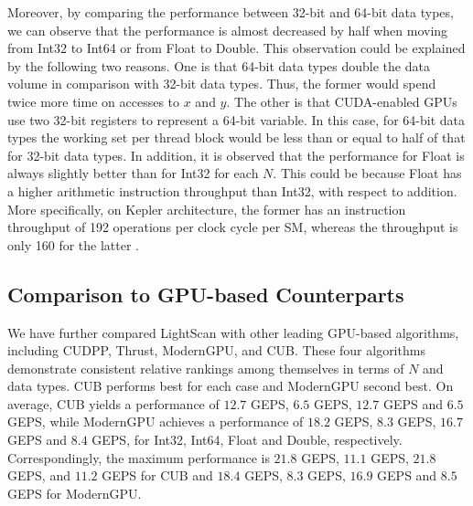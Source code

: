 \documentclass[article]{elsarticle}
\renewcommand{\hl}[1]{#1}
\begin{document}
{Moreover, by comparing the performance between 32-bit and 64-bit data types, we can observe that the performance is almost decreased by half when moving from Int32 to Int64 or from Float to Double. \hl{This observation could be explained by the following two reasons. One is that 64-bit data types double the data volume in comparison with 32-bit data types. Thus, the former would spend twice more time on accesses to $x$ and $y$. The other is that CUDA-enabled GPUs use two 32-bit registers to represent a 64-bit variable. In this case, for 64-bit data types the working set per thread block would be less than or equal to half of that for 32-bit data types.} In addition, it is observed that the performance for Float is always slightly better than for Int32 for each $N$. This could be because Float has a higher arithmetic instruction throughput than Int32, with respect to addition. More specifically, on Kepler architecture, the former has an instruction throughput of 192 operations per clock cycle per SM, whereas the throughput is only 160 for the latter \cite{cudacprogramming}.
\subsection{Comparison to GPU-based Counterparts}
\label{sec:results_gpu}
We have further compared LightScan with other leading GPU-based algorithms, including CUDPP, Thrust, ModernGPU, and CUB. These four algorithms demonstrate consistent relative rankings among themselves in terms of $N$ and data types. CUB performs best for each case and ModernGPU second best. On average, CUB yields a performance of $12.7$ GEPS, $6.5$ GEPS, $12.7$ GEPS and $6.5$ GEPS, while ModernGPU achieves a performance of $18.2$ GEPS, $8.3$ GEPS, $16.7$ GEPS and $8.4$ GEPS, for Int32, Int64, Float and Double, respectively. Correspondingly, the maximum performance is $21.8$ GEPS, $11.1$ GEPS, $21.8$ GEPS, and $11.2$ GEPS for CUB and $18.4$ GEPS, $8.3$ GEPS, $16.9$ GEPS and $8.5$ GEPS for ModernGPU.

}
\end{document}
